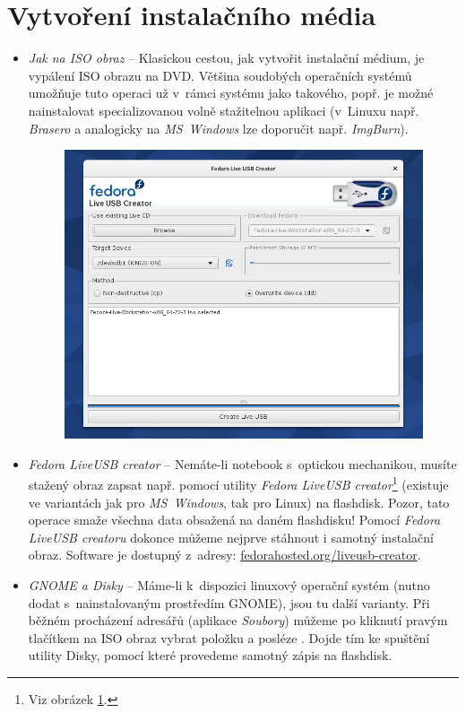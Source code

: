 \section*{Vytvoření instalačního média}
\begin{itemize}
\item\emph{Jak na ISO obraz} -- Klasickou cestou, jak vytvořit instalační médium, je vypálení ISO obrazu na DVD. Většina soudobých operačních systémů umožňuje tuto operaci už v~rámci systému jako takového, popř. je možné nainstalovat specializovanou volně stažitelnou aplikaci (v~Linuxu např. \emph{Brasero} a analogicky na \emph{MS~Windows} lze doporučit např. \emph{ImgBurn}).

\begin{figure}[t]
\begin{center}
\includegraphics[width=\textwidth]{img/liveusb}
 \label{fig:liveusb}
\end{center}
\end{figure}

\item\emph{Fedora LiveUSB creator} -- Nemáte-li notebook s~optickou mechanikou, musíte stažený obraz zapsat např. pomocí utility \emph{Fedora LiveUSB creator}\footnote{Viz obrázek \ref{fig:liveusb}.} (existuje ve variantách jak pro \emph{MS~Windows}, tak pro Linux) na flashdisk. Pozor, tato operace smaže všechna data obsažená na daném flashdisku! Pomocí \emph{Fedora LiveUSB creatoru} dokonce můžeme nejprve stáhnout i samotný instalační obraz. Software je dostupný z~adresy: \url{fedorahosted.org/liveusb-creator}.

\item\emph{GNOME a Disky} -- Máme-li k~dispozici linuxový operační systém (nutno dodat s~nainstalovaným prostředím GNOME), jsou tu další varianty. Při běžném procházení adresářů (aplikace \emph{Soubory}) můžeme po kliknutí pravým tlačítkem na ISO obraz vybrat položku  a posléze . Dojde tím ke spuštění utility Disky, pomocí které provedeme samotný zápis na flashdisk.
\end{itemize}

